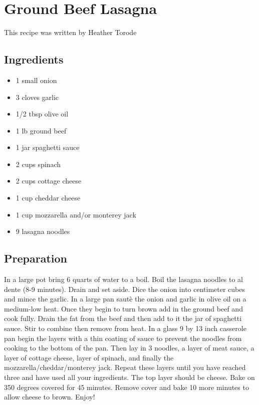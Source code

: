 \thispagestyle{fancy}
\section{Ground Beef Lasagna}
\AddToShipoutPicture*{\Lasagna}

This recipe was written by Heather Torode

\subsection*{Ingredients}
\begin{multicols}{3}
	\begin{itemize}
		\item 1 small onion
		\item 3 cloves garlic		
		\item 1/2 tbsp olive oil		
		\item 1 lb ground beef		
		\item 1 jar spaghetti sauce
		\item 2 cups spinach		
		\item 2 cups cottage cheese
		\item 1 cup cheddar cheese
		\item 1 cup mozzarella and/or monterey jack
		\item 9 lasagna noodles
	\end{itemize}
\end{multicols}

\subsection*{Preparation}

In a large pot bring 6 quarts of water to a boil. Boil the lasagna noodles to al dente (8-9 minutes). Drain and set aside. Dice the onion into centimeter cubes and mince the garlic. In a large pan saut\`{e} the onion and garlic in olive oil on a medium-low heat. Once they begin to turn brown add in the ground beef and cook fully. Drain the fat from the beef and then add to it the jar of spaghetti sauce. Stir to combine then remove from heat. In a glass 9 by 13 inch casserole pan begin the layers with a thin coating of sauce to prevent the noodles from cooking to the bottom of the pan. Then lay in 3 noodles, a layer of meat sauce, a layer of cottage cheese, layer of spinach, and finally the mozzarella/cheddar/monterey jack. Repeat these layers until you have reached three and have used all your ingredients. The top layer should be cheese. Bake on 350 degrees covered for 45 minutes. Remove cover and bake 10 more minutes to allow cheese to brown. Enjoy!
